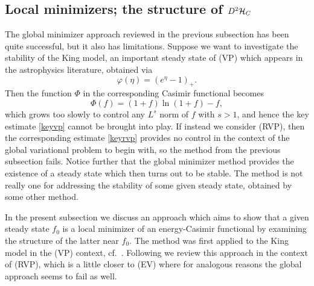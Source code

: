 \documentclass[11pt]{article}
\begin{document}
\subsection{Local minimizers; the structure of $D^2 {\cal H}_C$}
\label{locvar_vp}
%
The global minimizer approach reviewed in the previous subsection has been quite
successful, but it also has limitations. Suppose we want to investigate the
stability of the King model, an important steady state of (VP) which appears
in the astrophysics literature, obtained via
\[ %
\varphi(\eta)=(e^\eta-1)_+ .
\]
Then the function $\Phi$ in the corresponding Casimir functional
becomes
\[ %
\Phi(f)=(1+f)\ln(1+f) -f,
\]
which grows too slowly to control any $L^s$ norm of $f$ with $s>1$,
and hence the key estimate \eqref{keyvp} cannot be brought into play.
If instead we consider (RVP), then the corresponding
estimate \eqref{keyrvp} provides no control in the context of the global
variational problem to begin with,
so the method from the previous subsection fails.
Notice further that the global minimizer method provides the existence of a
steady state which then turns out to be stable. The method is not really
one for addressing the stability of some given steady state, obtained
by some other method.

In the present subsection we discuss an approach which aims to show that
a given steady state $f_0$ is a local minimizer of an energy-Casimir functional
by examining the structure of the latter near $f_0$. The method was
first applied to the King model in the (VP) context, cf.~\cite{GuRe2007}.
Following \cite{HaRe2007} we review this approach in the context of (RVP),
which is a little closer to (EV) where for analogous reasons the global
approach seems to fail as well.
\end{document}
